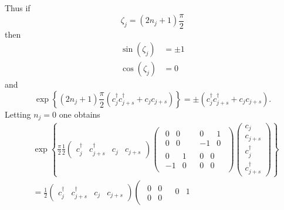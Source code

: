 \documentclass[aps, preprint]{revtex4}
\begin{document}
Thus if
\begin{equation*}\zeta _{j} =\left (2 n_{j} +1\right ) \frac{\pi }{2}
\end{equation*}then
\begin{align}\sin  \left (\zeta _{j}\right ) &  = \pm 1 \\
\cos  \left (\zeta _{j}\right ) &  =0\end{align}and
\begin{equation}\exp  \left \{\left (2 n_{j} +1\right ) \frac{\pi }{2} \left (c_{j}^{ \dag } c_{j +s}^{ \dag } +c_{j} c_{j +s}\right )\right \} = \pm \left (c_{j}^{ \dag } c_{j +s}^{ \dag } +c_{j} c_{j +s}\right )\text{.}
\end{equation}Letting $n_{j} =0$ one obtains
\begin{align} & \exp  \left \{\frac{\pi }{2} \frac{1}{2} \left (\begin{array}{cccc}c_{j}^{ \dag } & c_{j +s}^{ \dag } & c_{j} & c_{j +s}\end{array}\right ) \left (\begin{array}{cc}\begin{array}{cc}0 & 0 \\
0 & 0\end{array} & \begin{array}{cc}0 & 1 \\
 -1 & 0\end{array} \\
\begin{array}{cc}0 & 1 \\
 -1 & 0\end{array} & \begin{array}{cc}0 & 0 \\
0 & 0\end{array}\end{array}\right ) \left (\begin{array}{c}c_{j} \\
c_{j +s} \\
c_{j}^{ \dag } \\
c_{j +s}^{ \dag }\end{array}\right )\right \} \\
 &  =\frac{1}{2} \left (\begin{array}{cccc}c_{j}^{ \dag } & c_{j +s}^{ \dag } & c_{j} & c_{j +s}\end{array}\right ) \left (\begin{array}{cc}\begin{array}{cc}0 & 0 \\
0 & 0\end{array} & \begin{array}{cc}0 & 1 \\

\end{array}
\end{array}
\end{align}
\end{document}

